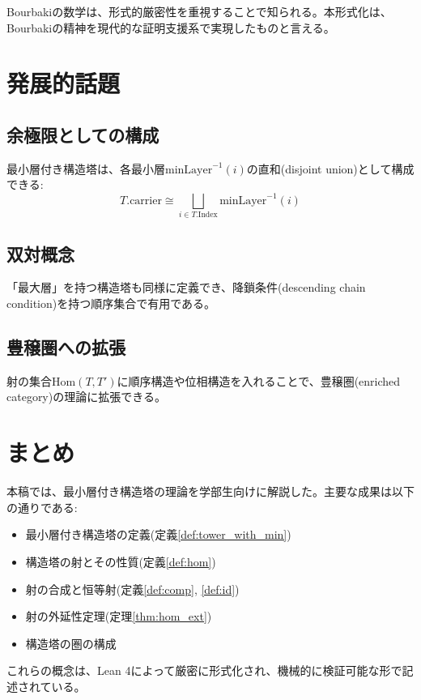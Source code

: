 \documentclass[a4paper,12pt]{article}
\theoremstyle{definition}
\begin{document}
Bourbakiの数学は、形式的厳密性を重視することで知られる。本形式化は、Bourbakiの精神を現代的な証明支援系で実現したものと言える。

\section{発展的話題}

\subsection{余極限としての構成}

最小層付き構造塔は、各最小層$\text{minLayer}^{-1}(i)$の直和(disjoint union)として構成できる:
\[
T.\text{carrier} \cong \bigsqcup_{i \in T.\text{Index}} \text{minLayer}^{-1}(i)
\]

\subsection{双対概念}

「最大層」を持つ構造塔も同様に定義でき、降鎖条件(descending chain condition)を持つ順序集合で有用である。

\subsection{豊穣圏への拡張}

射の集合$\text{Hom}(T, T')$に順序構造や位相構造を入れることで、豊穣圏(enriched category)の理論に拡張できる。

\section{まとめ}

本稿では、最小層付き構造塔の理論を学部生向けに解説した。主要な成果は以下の通りである:

\begin{itemize}
\item 最小層付き構造塔の定義(定義\ref{def:tower_with_min})
\item 構造塔の射とその性質(定義\ref{def:hom})
\item 射の合成と恒等射(定義\ref{def:comp}, \ref{def:id})
\item 射の外延性定理(定理\ref{thm:hom_ext})
\item 構造塔の圏の構成
\end{itemize}

これらの概念は、Lean 4によって厳密に形式化され、機械的に検証可能な形で記述されている。
\end{document}
